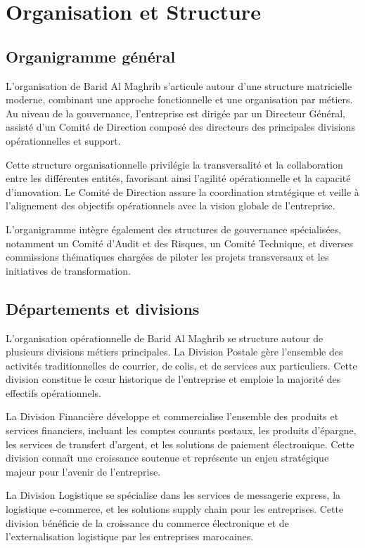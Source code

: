 \section{Organisation et Structure}

\subsection{Organigramme général}

L'organisation de Barid Al Maghrib s'articule autour d'une structure matricielle moderne, combinant une approche fonctionnelle et une organisation par métiers. Au niveau de la gouvernance, l'entreprise est dirigée par un Directeur Général, assisté d'un Comité de Direction composé des directeurs des principales divisions opérationnelles et support.

Cette structure organisationnelle privilégie la transversalité et la collaboration entre les différentes entités, favorisant ainsi l'agilité opérationnelle et la capacité d'innovation. Le Comité de Direction assure la coordination stratégique et veille à l'alignement des objectifs opérationnels avec la vision globale de l'entreprise.

L'organigramme intègre également des structures de gouvernance spécialisées, notamment un Comité d'Audit et des Risques, un Comité Technique, et diverses commissions thématiques chargées de piloter les projets transversaux et les initiatives de transformation.

\subsection{Départements et divisions}

L'organisation opérationnelle de Barid Al Maghrib se structure autour de plusieurs divisions métiers principales. La Division Postale gère l'ensemble des activités traditionnelles de courrier, de colis, et de services aux particuliers. Cette division constitue le cœur historique de l'entreprise et emploie la majorité des effectifs opérationnels.

La Division Financière développe et commercialise l'ensemble des produits et services financiers, incluant les comptes courants postaux, les produits d'épargne, les services de transfert d'argent, et les solutions de paiement électronique. Cette division connaît une croissance soutenue et représente un enjeu stratégique majeur pour l'avenir de l'entreprise.

La Division Logistique se spécialise dans les services de messagerie express, la logistique e-commerce, et les solutions supply chain pour les entreprises. Cette division bénéficie de la croissance du commerce électronique et de l'externalisation logistique par les entreprises marocaines.

